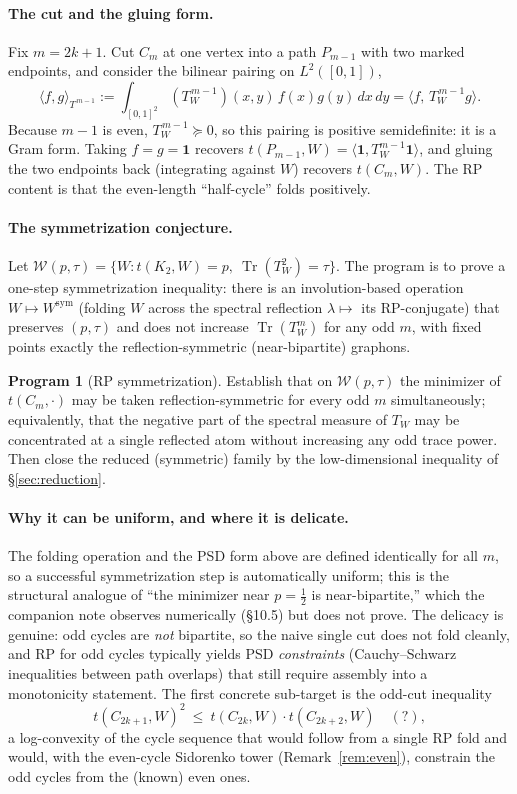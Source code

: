 \documentclass[11pt]{article}
\theoremstyle{definition}
\newtheorem{program}[theorem]{Program}
\newcommand{\Tr}{\operatorname{Tr}}
\newcommand{\1}{\mathbf{1}}
\begin{document}
\paragraph{The cut and the gluing form.}
Fix $m=2k+1$. Cut $C_m$ at one vertex into a path $P_{m-1}$ with two marked
endpoints, and consider the bilinear pairing on $L^2([0,1])$,
\[
\langle f,g\rangle_{T^{\,m-1}}:=\int_{[0,1]^2}(T_W^{\,m-1})(x,y)\,f(x)g(y)\,dx\,dy
=\bigl\langle f,\,T_W^{\,m-1}g\bigr\rangle .
\]
Because $m-1$ is even, $T_W^{\,m-1}\succeq0$, so this pairing is positive
semidefinite: it is a Gram form. Taking $f=g=\1$ recovers
$t(P_{m-1},W)=\langle\1,T_W^{m-1}\1\rangle$, and gluing the two endpoints back
(integrating against $W$) recovers $t(C_m,W)$. The RP content is that the
even-length ``half-cycle'' folds positively.

\paragraph{The symmetrization conjecture.}
Let $\mathcal{W}(p,\tau)=\{W:t(K_2,W)=p,\ \Tr(T_W^2)=\tau\}$. The program is to
prove a one-step symmetrization inequality: there is an involution-based
operation $W\mapsto W^{\mathrm{sym}}$ (folding $W$ across the spectral
reflection $\lambda\mapsto$ its RP-conjugate) that preserves $(p,\tau)$ and does
not increase $\Tr(T_W^m)$ for any odd $m$, with fixed points exactly the
reflection-symmetric (near-bipartite) graphons.

\begin{program}[RP symmetrization]\label{prog:rp}
Establish that on $\mathcal{W}(p,\tau)$ the minimizer of $t(C_m,\cdot)$ may be
taken reflection-symmetric for every odd $m$ simultaneously; equivalently, that
the negative part of the spectral measure of $T_W$ may be concentrated at a
single reflected atom without increasing any odd trace power. Then close the
reduced (symmetric) family by the low-dimensional inequality of
\S\ref{sec:reduction}.
\end{program}

\paragraph{Why it can be uniform, and where it is delicate.}
The folding operation and the PSD form above are defined identically for all
$m$, so a successful symmetrization step is automatically uniform; this is the
structural analogue of ``the minimizer near $p=\tfrac12$ is near-bipartite,''
which the companion note observes numerically (\S10.5) but does not prove. The
delicacy is genuine: odd cycles are \emph{not} bipartite, so the naive single
cut does not fold cleanly, and RP for odd cycles typically yields PSD
\emph{constraints} (Cauchy--Schwarz inequalities between path overlaps) that
still require assembly into a monotonicity statement. The first concrete
sub-target is the odd-cut inequality
\[
t(C_{2k+1},W)^2\ \le\ t(C_{2k},W)\cdot t(C_{2k+2},W)\quad(?),
\]
a log-convexity of the cycle sequence that would follow from a single RP fold and
would, with the even-cycle Sidorenko tower (Remark~\ref{rem:even}), constrain the
odd cycles from the (known) even ones.
\end{document}
